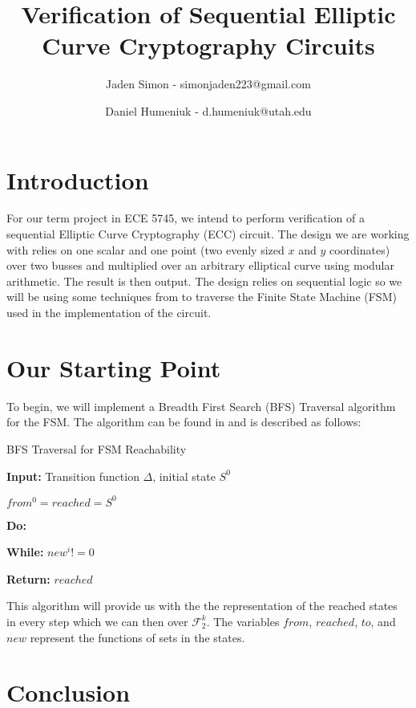 \documentclass[12pt]{report}
\title{Verification of Sequential Elliptic Curve Cryptography Circuits}
\author{Jaden Simon - simonjaden223@gmail.com \\ \and
	   Daniel Humeniuk - d.humeniuk@utah.edu}
\begin{document}
\maketitle

\section{Introduction}

For our term project in ECE 5745, we intend to perform verification of a sequential Elliptic Curve Cryptography (ECC) circuit. The design we are working with relies on  one scalar and one point (two evenly sized $x$ and $y$ coordinates) over two busses and multiplied over an arbitrary elliptical curve using modular arithmetic. The result is then output. The design relies on sequential logic so we will be using some techniques from \cite{Kalla} to traverse the Finite State Machine (FSM) used in the implementation of the circuit.

\section{Our Starting Point}

To begin, we will implement a Breadth First Search (BFS) Traversal algorithm for the FSM. The algorithm can be found in \cite{Kalla} and is described as follows:

\begin{algorithm}
\caption{BFS Traversal for FSM Reachability}

{\textbf{Input:} Transition function $\Delta$, initial state $S^0$}

{$from^0=reached=S^0$}

{\textbf{Do:}}

\hspace*{6mm}{$i \leftarrow i + 1 $}


\hspace*{6mm}{$new^i \leftarrow to^i \cap reached$}

\hspace*{6mm}{$reached \leftarrow reached \cup new^i$}

\hspace*{6mm}{$from^i \leftarrow new^i$}

{\textbf{While:} $new^i != 0$}

{\textbf{Return:} $reached$}

\end{algorithm}

This algorithm will provide us with the the representation of the reached states in every step which we can then over $\mathcal{F}_2^k$. The variables $from$, $reached$, $to$, and $new$ represent the functions of sets in the states.

\section{Conclusion}




\end{document}
